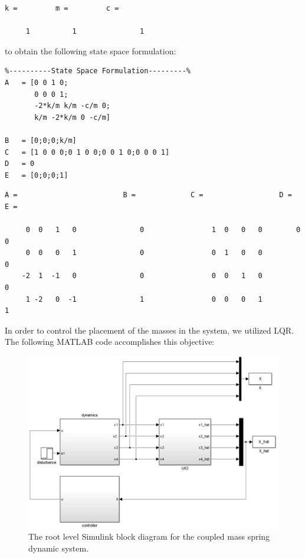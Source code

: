 \documentclass{amsart}
\theoremstyle{definition}
\theoremstyle{remark}
\numberwithin{equation}{section}
\begin{document}
        \color{lightgray} \begin{verbatim}
k =         m =         c =

     1          1               1

\end{verbatim} \color{black}
to obtain the following state space formulation: \\
    \begin{verbatim}
%----------State Space Formulation---------%
A   = [0 0 1 0;
       0 0 0 1;
       -2*k/m k/m -c/m 0;
       k/m -2*k/m 0 -c/m]

B   = [0;0;0;k/m]
C   = [1 0 0 0;0 1 0 0;0 0 1 0;0 0 0 1]
D   = 0
E   = [0;0;0;1]
\end{verbatim}

        \color{lightgray} \begin{verbatim}
A =                         B =             C =                  D =        E =

     0  0   1   0               0                1  0   0   0        0              0
     0  0   0   1               0                0  1   0   0                       0
    -2  1  -1   0               0                0  0   1   0                       0
     1 -2   0  -1               1                0  0   0   1                       1

\end{verbatim} \color{black}
In order to control the placement of the masses in the system, we utilized LQR.  The following MATLAB code accomplishes this objective:

\begin{figure}[H]
    \centering
    \includegraphics[scale=.35]{massSpringMDLroot.png}
    \caption{The root level Simulink block diagram for the coupled mass spring dynamic system.}
    \label{ex:msMDLroot}
\end{figure}
\end{document}
